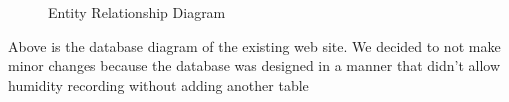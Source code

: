 \documentclass{report}
\begin{document}
\begin{figure}[H]
	\caption{Entity Relationship Diagram}
\end{figure}
\indent
Above is the database diagram of the existing web site. We decided to not make minor changes because the database was designed in a manner that didn't allow humidity recording without adding another table
\newpage
\end{document}
